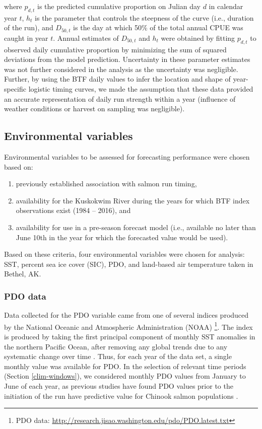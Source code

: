 \documentclass[12pt,]{book}
\providecommand{\tightlist}{%
  \setlength{\itemsep}{0pt}\setlength{\parskip}{0pt}}
\let\rmarkdownfootnote\footnote%
\def\footnote{\protect\rmarkdownfootnote}
\theoremstyle{definition}
\theoremstyle{definition}
\theoremstyle{definition}
\theoremstyle{remark}
\begin{document}
where \(p_{d,t}\) is the predicted cumulative proportion on Julian day
\(d\) in calendar year \(t\), \(h_t\) is the parameter that controls the
steepness of the curve (i.e., duration of the run), and \(D_{50,t}\) is
the day at which 50\% of the total annual CPUE was caught in year \(t\).
Annual estimates of \(D_{50,t}\) and \(h_t\) were obtained by fitting
\(p_{d,t}\) to observed daily cumulative proportion by minimizing the
sum of squared deviations from the model prediction. Uncertainty in
these parameter estimates was not further considered in the analysis as
the uncertainty was negligible. Further, by using the BTF daily values
to infer the location and shape of year-specific logistic timing curves,
we made the assumption that these data provided an accurate
representation of daily run strength within a year (influence of weather
conditions or harvest on sampling was negligible).

\subsection{Environmental variables}\label{environmental-variables}

\noindent
Environmental variables to be assessed for forecasting performance were
chosen based on:

\begin{enumerate}
\def\labelenumi{(\arabic{enumi})}
\tightlist
\item
  previously established association with salmon run timing,
\item
  availability for the Kuskokwim River during the years for which BTF
  index observations exist (1984 -- 2016), and
\item
  availability for use in a pre-season forecast model (i.e., available
  no later than June 10th in the year for which the forecasted value
  would be used).
\end{enumerate}

Based on these criteria, four environmental variables were chosen for
analysis: SST, percent sea ice cover (SIC), PDO, and land-based air
temperature taken in Bethel, AK.

\subsubsection{PDO data}\label{pdo-data}

\noindent
Data collected for the PDO variable came from one of several indices
produced by the National Oceanic and Atmospheric Administration (NOAA)
\citep{mantua-etal-1997}\footnote{PDO data:
  \url{http://research.jisao.washington.edu/pdo/PDO.latest.txt}}. The
index is produced by taking the first principal component of monthly SST
anomalies in the northern Pacific Ocean, after removing any global
trends due to any systematic change over time \citep{mantua-etal-1997}.
Thus, for each year of the data set, a single monthly value was
available for PDO. In the selection of relevant time periods (Section
\ref{clim-windows}), we considered monthly PDO values from January to
June of each year, as previous studies have found PDO values prior to
the initiation of the run have predictive value for Chinook salmon
populations \citep{beer-2007, keefer-etal-2008}.
\end{document}
